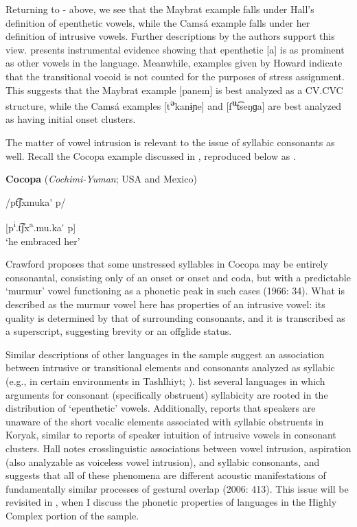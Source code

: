   Returning to - above, we see that the Maybrat example falls under Hall’s definition of epenthetic vowels, while the Camsá example falls under her definition of intrusive vowels. Further descriptions by the authors support this view. \citet[36]{Dol2007} presents instrumental evidence showing that epenthetic [a] is as prominent as other vowels in the language. Meanwhile, examples given by Howard indicate that the transitional vocoid is not counted for the purposes of stress assignment. This suggests that the Maybrat example [panem] is best analyzed as a CV.CVC structure, while the Camsá examples [t\textbf{\textsuperscript{ə}}kanɨɲe] and [f\textbf{\textsuperscript{u}}t͡seŋɡa] are best analyzed as having initial onset clusters.

  The matter of vowel intrusion is relevant to the issue of syllabic consonants as well. Recall the Cocopa example discussed in , reproduced below as .

\ea\label{ex:3.10}
  \textbf{Cocopa} (\textit{Cochimi-Yuman}; USA and Mexico)

/pt͡ʃxmuka\'{} p/

[p\textsuperscript{i}.t͡ʃx\textsuperscript{a}.mu.ka\'{} p]\\
\glt ‘he embraced her’
\citep[43]{Crawford1966}
\z

Crawford proposes that some unstressed syllables in Cocopa may be entirely consonantal, consisting only of an onset or onset and coda, but with a predictable ‘murmur’ vowel functioning as a phonetic peak in such cases (1966: 34). What is described as the murmur vowel here has properties of an intrusive vowel: its quality is determined by that of surrounding consonants, and it is transcribed as a superscript, suggesting brevity or an offglide status.

  Similar descriptions of other languages in the sample suggest an association between intrusive or transitional elements and consonants analyzed as syllabic (e.g., in certain environments in Tashlhiyt; \citealt{DellElmedlaoui2002}). \citet{HargusBeavert2006} list several languages in which arguments for consonant (specifically obstruent) syllabicity are rooted in the distribution of ‘epenthetic’ vowels. Additionally, \citet[185-6]{Bell1978a} reports that speakers are unaware of the short vocalic elements associated with syllabic obstruents in Koryak, similar to reports of speaker intuition of intrusive vowels in consonant clusters. Hall notes crosslinguistic associations between vowel intrusion, aspiration (also analyzable as voiceless vowel intrusion), and syllabic consonants, and suggests that all of these phenomena are different acoustic manifestations of fundamentally similar processes of gestural overlap (2006: 413). This issue will be revisited in , when I discuss the phonetic properties of languages in the Highly Complex portion of the sample.

